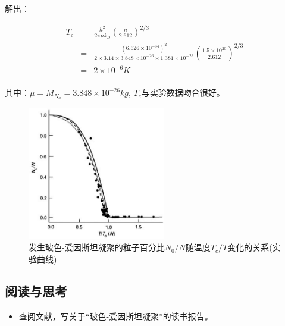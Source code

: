 解出：

\begin{eqnarray*}
T_c & = & \frac{{h^2 }}{{2\pi \mu k_B }}\left( {\frac{n}{{2.612}}}
\right)^{2/3}  \\
{} &=& \frac{{\left( {6.626 \times 10^{ - 34} } \right)^2
}}{{2 \times 3.14 \times 3.848 \times 10^{ - 26}  \times 1.381
\times 10^{ - 23} }}\left( {\frac{{1.5 \times 10^{20} }}{{2.612}}}
\right)^{2/3}\\
{} & = & 2 \times 10^{ - 6} K \\
\end{eqnarray*}

其中：$\mu = M_{N_a }  = 3.848 \times 10^{ - 26} kg$, $T_c$与实验数据吻合很好。



\begin{figure}[h]
\begin{center}
\includegraphics[clip,width=6cm]{IdenticalParticles/31-4.ps}
\caption{发生玻色-爱因斯坦凝聚的粒子百分比$N_0 / N$随温度$T_c / T$变化的关系(实验曲线)}
\end{center}
\end{figure}


\subsection*{阅读与思考}


\begin{itemize}

    \item 查阅文献，写关于``玻色-爱因斯坦凝聚''的读书报告。

   \end{itemize}
